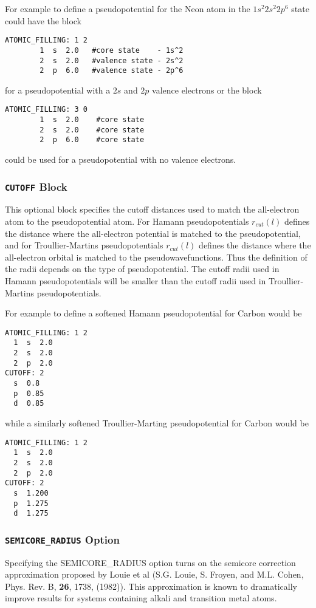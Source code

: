 For example to define a pseudopotential
for the Neon atom in the $1s^2 2s^2 2p^6$ state
could have the block
\begin{verbatim}
ATOMIC_FILLING: 1 2
        1  s  2.0   #core state    - 1s^2 
        2  s  2.0   #valence state - 2s^2
        2  p  6.0   #valence state - 2p^6
\end{verbatim}
for a pseudopotential with a $2s$ and $2p$ valence electrons
or the block
\begin{verbatim}
ATOMIC_FILLING: 3 0
        1  s  2.0    #core state
        2  s  2.0    #core state
        2  p  6.0    #core state
\end{verbatim}
could be used for a pseudopotential with no valence electrons.


\subsubsection{{\tt CUTOFF} Block}
This optional block specifies the cutoff distances used
to match the all-electron atom to the pseudopotential atom.  For
Hamann pseudopotentials $r_{cut}(l)$ defines the distance
where the all-electron potential is matched to the pseudopotential, and
for Troullier-Martins pseudopotentials $r_{cut}(l)$ defines the distance
where the all-electron orbital is matched to the pseudowavefunctions. 
Thus the definition of the radii depends on the type of pseudopotential.  
The cutoff radii used in Hamann pseudopotentials will be smaller than
the cutoff radii used in Troullier-Martins pseudopotentials.  

For example to define a softened Hamann pseudopotential for
Carbon would be
\begin{verbatim}
ATOMIC_FILLING: 1 2
  1  s  2.0
  2  s  2.0
  2  p  2.0
CUTOFF: 2
  s  0.8
  p  0.85
  d  0.85
\end{verbatim}
while a similarly softened Troullier-Marting pseudopotential
for Carbon would be
\begin{verbatim}
ATOMIC_FILLING: 1 2
  1  s  2.0
  2  s  2.0
  2  p  2.0
CUTOFF: 2
  s  1.200
  p  1.275
  d  1.275
\end{verbatim}


\subsubsection{{\tt SEMICORE\_RADIUS} Option}
Specifying the SEMICORE\_RADIUS option turns on the semicore correction approximation proposed
by Louie et al (S.G. Louie, S. Froyen, and M.L. Cohen, Phys. Rev. B, \textbf{26}, 1738, (1982)).  
This approximation is known to dramatically improve results for systems containing 
alkali and transition metal atoms.  


